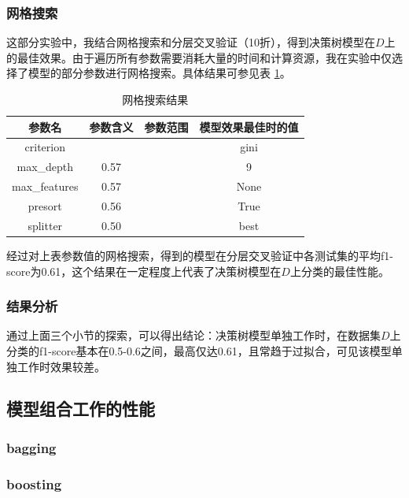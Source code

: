 \documentclass[12pt,a4paper]{article}
\theoremstyle{definition}
\begin{document}
\subsubsection{网格搜索}

这部分实验中，我结合网格搜索和分层交叉验证（10折），得到决策树模型在$D$上的最佳效果。由于遍历所有参数需要消耗大量的时间和计算资源，我在实验中仅选择了模型的部分参数进行网格搜索。具体结果可参见表 \ref{tab:grid-search}。

\begin{table}[H]
	\renewcommand\arraystretch{1.35}
	\caption{网格搜索结果}
	\label{tab:grid-search}
	\centering
	
	\begin{tabular}{c|c|c|c}
		\centering
		参数名 & 参数含义 & 参数范围 & 模型效果最佳时的值 \\
		\hline
		criterion & & & gini \\
		max\_depth & 0.57 & & 9 \\
		max\_features & 0.57 & & None \\
		presort & 0.56 & & True \\
		splitter & 0.50 & & best \\
	\end{tabular}
\end{table}

经过对上表参数值的网格搜索，得到的模型在分层交叉验证中各测试集的平均f1-score为0.61，这个结果在一定程度上代表了决策树模型在$D$上分类的最佳性能。

\subsubsection{结果分析}

通过上面三个小节的探索，可以得出结论：决策树模型单独工作时，在数据集$D$上分类的f1-score基本在0.5-0.6之间，最高仅达0.61，且常趋于过拟合，可见该模型单独工作时效果较差。

\subsection{模型组合工作的性能}

\subsubsection{bagging}

\subsubsection{boosting}
\end{document}
